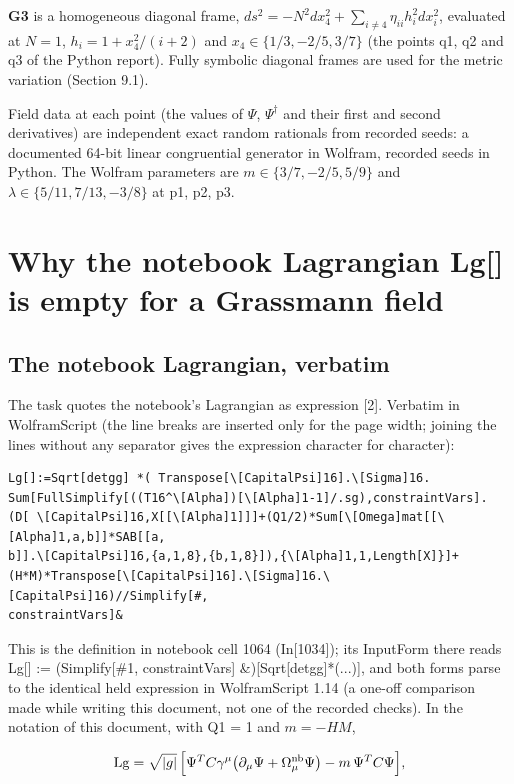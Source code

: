 \documentclass[11pt]{article}
\begin{document}
\textbf{G3} is a homogeneous diagonal frame, $ds^2=-N^2dx_4^2+\sum_{i\ne4}\eta_{ii}h_i^2dx_i^2$, evaluated at $N=1$, $h_i=1+x_4^2/(i+2)$ and $x_4\in\{1/3,-2/5,3/7\}$ (the points q1, q2 and q3 of the Python report). Fully symbolic diagonal frames are used for the metric variation (Section 9.1).

Field data at each point (the values of $\Psi$, $\Psi^\dagger$ and their first and second derivatives) are independent exact random rationals from recorded seeds: a documented 64-bit linear congruential generator in Wolfram, recorded seeds in Python. The Wolfram parameters are $m\in\{3/7,-2/5,5/9\}$ and $\lambda\in\{5/11,7/13,-3/8\}$ at p1, p2, p3.

\section{Why the notebook Lagrangian Lg[] is empty for a Grassmann field}

\subsection{The notebook Lagrangian, verbatim}

The task quotes the notebook's Lagrangian as expression [2]. Verbatim in WolframScript (the line breaks are inserted only for the page width; joining the lines without any separator gives the expression character for character):

\begin{Verbatim}[fontsize=\small]
Lg[]:=Sqrt[detgg] *( Transpose[\[CapitalPsi]16].\[Sigma]16.
Sum[FullSimplify[((T16^\[Alpha])[\[Alpha]1-1]/.sg),constraintVars].
(D[ \[CapitalPsi]16,X[[\[Alpha]1]]]+(Q1/2)*Sum[\[Omega]mat[[\[Alpha]1,a,b]]*SAB[[a,
b]].\[CapitalPsi]16,{a,1,8},{b,1,8}]),{\[Alpha]1,1,Length[X]}]+
(H*M)*Transpose[\[CapitalPsi]16].\[Sigma]16.\[CapitalPsi]16)//Simplify[#,
constraintVars]&
\end{Verbatim}

This is the definition in notebook cell 1064 (In[1034]); its InputForm there reads Lg[] := (Simplify[\#1, constraintVars] \&)[Sqrt[detgg]*(...)], and both forms parse to the identical held expression in WolframScript 1.14 (a one-off comparison made while writing this document, not one of the recorded checks). In the notation of this document, with Q1 = 1 and $m=-HM$,

\[
\mathrm{Lg}=\sqrt{|g|}\,\Bigl[\Psi^T C\gamma^\mu\bigl(\partial_\mu\Psi+\Omega^{\mathrm{nb}}_\mu\Psi\bigr)-m\,\Psi^T C\Psi\Bigr],
\]
\end{document}
